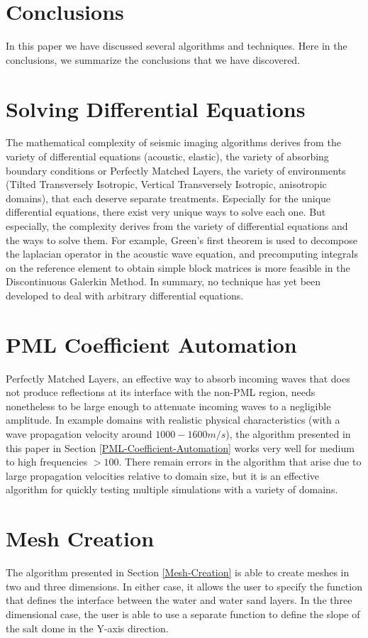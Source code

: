 \newpage
\section{Conclusions}

In this paper we have discussed several algorithms and techniques. Here in the conclusions, we summarize the conclusions that we have discovered.

\section{Solving Differential Equations}

The mathematical complexity of seismic imaging algorithms derives from the variety of differential equations (acoustic, elastic), the variety of absorbing boundary conditions or Perfectly Matched Layers, the variety of environments (Tilted Transversely Isotropic, Vertical Transversely Isotropic, anisotropic domains), that each deserve separate treatments. Especially for the unique differential equations, there exist very unique ways to solve each one. But especially, the complexity derives from the variety of differential equations and the ways to solve them. For example, Green's first theorem is used to decompose the laplacian operator in the acoustic wave equation, and precomputing integrals on the reference element to obtain simple block matrices is more feasible in the Discontinuous Galerkin Method. In summary, no technique has yet been developed to deal with arbitrary differential equations. 


\section{PML Coefficient Automation}

Perfectly Matched Layers, an effective way to absorb incoming waves that does not produce reflections at its interface with the non-PML region, needs nonetheless to be large enough to attenuate incoming waves to a negligible amplitude. In example domains with realistic physical characteristics (with a wave propagation velocity around $1000-1600 m/s$), the algorithm presented in this paper in Section \ref{PML-Coefficient-Automation} works very well for medium to high frequencies $> 100$. There remain errors in the algorithm that arise due to large propagation velocities relative to domain size, but it is an effective algorithm for quickly testing multiple simulations with a variety of domains.


\section{Mesh Creation}

The algorithm presented in Section \ref{Mesh-Creation} is able to create meshes in two and three dimensions. In either case, it allows the user to specify the function that defines the interface between the water and water sand layers. In the three dimensional case, the user is able to use a separate function to define the slope of the salt dome in the Y-axis direction.








